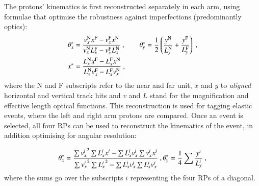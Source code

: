 The protons' kinematics is first reconstructed separately in each arm, using formulae that optimise the robustness against imperfections (predominantly optics):
\begin{equation}
\label{eq:kin 1a}
	\begin{aligned}
		\theta_x^* &= {v_x^{\rm N} x^{\rm F} - v_x^{\rm F} x^{\rm N}\over v_x^{\rm N} L_x^{\rm F} - v_x^{\rm F} L_x^{\rm N}}\ ,\qquad
		\theta_y^* = {1\over 2} \left( {y^{\rm N}\over L_y^{\rm N}} + {y^{\rm F}\over L_y^{\rm F}} \right)\ ,\\
		x^* &= {L_x^{\rm N} x^{\rm F} - L_x^{\rm F} x^{\rm N}\over L_x^{\rm N} v_x^{\rm F} - L_x^{\rm F} v_x^{\rm N}}\ , \\
	\end{aligned}
\end{equation}
where the N and F subscripts refer to the near and far unit, $x$ and $y$ to {\em aligned} horizontal and vertical track hits and $v$ and $L$ stand for the magnification and effective length optical functions. This reconstruction is used for tagging elastic events, where the left and right arm protons are compared. Once an event is selected, all four RPs can be used to reconstruct the kinematics of the event, in addition optimising for angular resolution:

\begin{equation}
\label{eq:kin 2a}
		\theta_x^* = {
				\sum {v_x^i}^2 \sum L_x^i x^i - \sum L_x^i v_x^i \sum v_x^i x^i
				\over
				\sum {v_x^i}^2 \sum {L_x^i}^2 - \sum L_x^i v_x^i \sum L_x^i v_x^i
			}\ ,
		\theta_y^* = {1\over 4} \sum {y^i\over L_y^i}\ ,
\end{equation}
where the sums go over the subscripts $i$ representing the four RPs of a diagonal.



